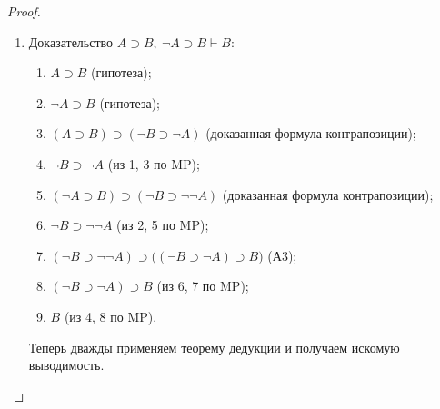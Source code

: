 \begin{proof}
\begin{enumerate}[label=\arabic*)]
        \item Доказательство $A \supset B,\ \neg A \supset B \vdash B$:
        \begin{enumerate}[label=\arabic*.]
            \item $A \supset B$ (гипотеза);
            \item $\neg A \supset B$ (гипотеза);
            \item $(A \supset B) \supset (\neg B \supset \neg A)$ (доказанная формула контрапозиции);
            \item $\neg B \supset \neg A$ (из 1, 3 по MP);
            \item $(\neg A \supset B) \supset (\neg B \supset \neg\neg A)$ (доказанная формула контрапозиции);
            \item $\neg B \supset \neg\neg A$ (из 2, 5 по MP);
            \item $(\neg B \supset \neg\neg A) \supset \big((\neg B \supset \neg A) \supset B\big)$ (А3);
            \item $(\neg B \supset \neg A) \supset B$ (из 6, 7 по MP);
            \item $B$ (из 4, 8 по MP).
        \end{enumerate}
        Теперь дважды применяем теорему дедукции и получаем искомую выводимость.
    \end{enumerate}
\end{proof}